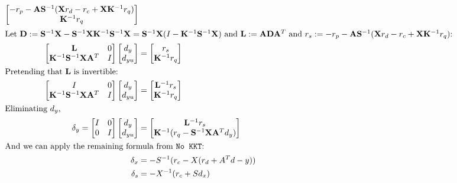 \documentclass[10pt,a4paper]{article}
\begin{document}
\begin{align*}
\begin{bmatrix}
	-r_p - \mathbf{A}\mathbf{S}^{-1}(\mathbf{X}r_d - r_c + \mathbf{X}\mathbf{K}^{-1}r_q) \\
	\mathbf{K}^{-1}r_q
\end{bmatrix} \\
\intertext{Let $\mathbf{D} := \mathbf{S}^{-1}\mathbf{X} - \mathbf{S}^{-1}\mathbf{X}\mathbf{K}^{-1}\mathbf{S}^{-1}\mathbf{X} = \mathbf{S}^{-1}\mathbf{X}(I - \mathbf{K}^{-1}\mathbf{S}^{-1}\mathbf{X})$ and $\mathbf{L} := \mathbf{A}\mathbf{D}\mathbf{A}^T$ and $r_s := -r_p - \mathbf{A}\mathbf{S}^{-1}(\mathbf{X}r_d - r_c + \mathbf{X}\mathbf{K}^{-1}r_q)$:}
\begin{bmatrix}
	\mathbf{L} & 0 \\
	\mathbf{K}^{-1}\mathbf{S}^{-1}\mathbf{X}\mathbf{A}^T & I
\end{bmatrix}
\begin{bmatrix}d_y \\ d_{yu}\end{bmatrix} &=
\begin{bmatrix}
	r_s \\
	\mathbf{K}^{-1}r_q
\end{bmatrix} \\
\intertext{Pretending that $\mathbf{L}$ is invertible:}
\begin{bmatrix}
	I & 0 \\
	\mathbf{K}^{-1}\mathbf{S}^{-1}\mathbf{X}\mathbf{A}^T & I
\end{bmatrix}
\begin{bmatrix}d_y \\ d_{yu}\end{bmatrix} &=
\begin{bmatrix}
	\mathbf{L}^{-1}r_s \\
	\mathbf{K}^{-1}r_q
\end{bmatrix} \\
\intertext{Eliminating $d_y$,}
\delta_y = \begin{bmatrix}
	I & 0 \\
	0 & I
\end{bmatrix}
\begin{bmatrix}d_y \\ d_{yu}\end{bmatrix} &=
\begin{bmatrix}
	\mathbf{L}^{-1}r_s \\
	\mathbf{K}^{-1}(r_q - \mathbf{S}^{-1}\mathbf{X}\mathbf{A}^Td_y)
\end{bmatrix} \\
\intertext{And we can apply the remaining formula from \texttt{No KKT}:}
\delta_x &= -S^{-1}(r_c - X(r_d + A^Td-y))\\
\delta_s &= -X^{-1}(r_c + Sd_x)
\end{align*}
\end{document}
